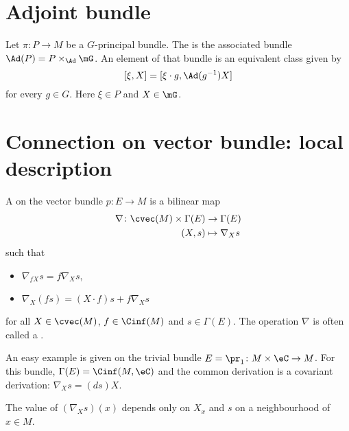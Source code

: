 

\section{Adjoint bundle}

Let $\pi\colon P\to M$ be a $G$-principal bundle. The  is the associated bundle $\Ad(P)=P\times_{\Ad}\mG$. An element of that bundle is an equivalent class given by
\[
  [\xi,X]=[\xi\cdot g,\Ad(g^{-1})X]
\]
for every $g\in G$. Here $\xi\in P$ and $X\in\mG$.

\section{Connection on vector bundle: local description}\label{sec:conn_vect}

\begin{definition}      \label{DEFooIESVooGNQHzl}
    A  on the vector bundle $p\colon E\to M$ is a bilinear map
    \begin{equation}
        \begin{aligned}
                \nabla \colon \cvec(M)\times\Gamma(E) &\to \Gamma(E)\\
                (X,s)&\mapsto \nabla_Xs
        \end{aligned}
    \end{equation}
     such that
     \begin{itemize}
     \item $\nabla_{fX}s=f\nabla_Xs$,
     \item $\nabla_X(fs)=(X\cdot f)s+f\nabla_Xs$
     \end{itemize}
    for all $X\in\cvec(M)$, $f\in\Cinf(M)$ and $s\in\Gamma(E)$. The operation $\nabla$ is often called a .
\end{definition}

An easy example is given on the trivial bundle $E=\pr_1\colon M\times\eC\to M$. For this bundle, $\Gamma(E)=\Cinf(M,\eC)$ and the common derivation is a covariant derivation: $\nabla_Xs=(ds)X$.

\begin{proposition}     \label{PROPooWZYOooEVhgFt}
The value of $(\nabla_Xs)(x)$ depends only on $X_x$ and $s$ on a neighbourhood of $x\in M$.
\end{proposition}

